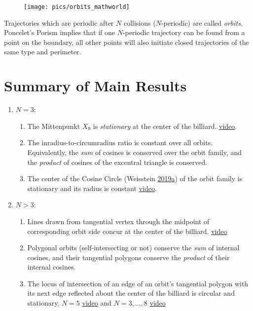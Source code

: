 \documentclass[]{article}
\providecommand{\tightlist}{%
  \setlength{\itemsep}{0pt}\setlength{\parskip}{0pt}}
\begin{document}
\begin{figure}[H]

{\centering \texttt{[image: pics/orbits\_mathworld]} 

}

\end{figure}

Trajectories which are periodic after \(N\) collisions (\(N\)-periodic) are called \emph{orbits}. Poncelet's Porism implies that if one \(N\)-periodic trajectory can be found from a point on the boundary, all other points will also initiate closed trajectories of the same type and perimeter.

\hypertarget{summary-of-main-results}{%
\section{Summary of Main Results}\label{summary-of-main-results}}

\begin{enumerate}
\def\labelenumi{\arabic{enumi}.}
\tightlist
\item
  \(N=3\):

  \begin{enumerate}
  \def\labelenumii{\arabic{enumii}.}
  \tightlist
  \item
    The Mittenpunkt \(X_{9}\) is \emph{stationary} at the center of the billiard. \href{https://youtu.be/AoCWcza95OA}{video}.
  \item
    The inradius-to-circumradius ratio is constant over all orbits. Equivalently, the \emph{sum} of cosines is conserved over the orbit family, and the \emph{product} of cosines of the excentral triangle is conserved.
  \item
    The center of the Cosine Circle (Weisstein \protect\hyperlink{ref-mw}{2019}\protect\hyperlink{ref-mw}{a}) of the orbit family is stationary and its radius is constant \href{https://www.youtube.com/watch?v=hCQIT6_XhaQ}{video}.
  \end{enumerate}
\item
  \(N>3\):

  \begin{enumerate}
  \def\labelenumii{\arabic{enumii}.}
  \tightlist
  \item
    Lines drawn from tangential vertex through the midpoint of corresponding orbit side concur at the center of the billiard. \href{https://www.youtube.com/watch?v=4lj9yQ-e_cE}{video}
  \item
    Polygonal orbits (self-intersecting or not) conserve the \emph{sum} of internal cosines, and their tangential polygons conserve the \emph{product} of their internal cosines.
  \item
    The locus of intersection of an edge of an orbit's tangential polygon with its next edge reflected about the center of the billiard is circular and stationary. \(N=5\) \href{https://www.youtube.com/watch?v=dINE4aH1cvk}{video} and \(N=3,\ldots,8\) \href{https://www.youtube.com/watch?v=EFeINGIDFrg}{video}
  \end{enumerate}
\end{enumerate}
\end{document}
